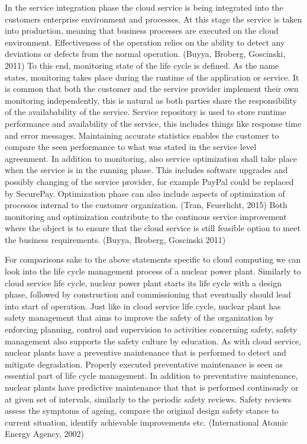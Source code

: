 \documentclass{article}
\begin{document}
In the service integration phase the cloud service is being integrated into the customers enterprise environment and processes. At this stage the service is taken into production, meaning that business processes are executed on the cloud environment. Effectiveness of the operation relies on the ability to detect any deviations or defects from the normal operation. (Buyya, Broberg, Goscinski, 2011) To this end, monitoring state of the life cycle is defined. As the name states, monitoring takes place during the runtime of the application or service. It is common that both the customer and the service provider implement their own monitoring independently, this is natural as both parties share the responsibility of the availabability of the service. Service repository is used to store runtime performance and availability of the service, this includes things like response time and error messages. Maintaining accurate statistics enables  the customer to compare the seen performance to what was stated in the service level agreenment. In addition to monitoring, also service optimization shall take place when the service is in the running phase. This includes software upgrades and possibly changing of the service provider, for example PayPal could be replaced by SecurePay. Optimization phase can also include aspects of optimization of processes internal to the customer organization. (Tran, Feuerlicht, 2015) Both monitoring and optimization contribute to the continous service improvement where the object is to ensure that the cloud service is still feasible option to meet the business requirements. (Buyya, Broberg, Goscinski 2011)
\par
For comparisons sake to the above statements specific to cloud computing we can look into the life cycle management process of a nuclear power plant. Similarly to cloud service life cycle, nuclear power plant starts its life cycle with a design phase, followed by construction and commissioning that eventually should lead into start of operation. Just like in cloud service life cycle, nuclear plant has safety management that aims to improve the safety of the organization by enforcing planning, control and supervision to activities concerning safety, safety management also supports the safety culture by education. As with cloud service, nuclear plants have a preventive maintenance that is performed to detect and mitigate degradation. Properly executed preventative maintenance is seen as essential part of life cycle management. In addition to preventative maintenance, nuclear plants have predictive maintenance that that is performed continously or at given set of intervals, similarly to the periodic safety reviews. Safety reviews assess the symptoms of ageing, compare the original design safety stance to current situation, identify achievable improvements etc. (International Atomic Energy Agency, 2002) 
\end{document}
